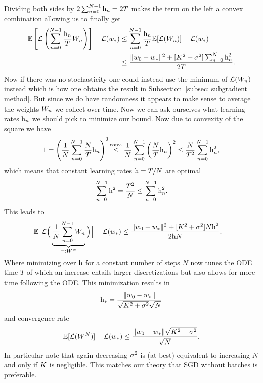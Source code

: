 Dividing both sides by \(2\sum_{n=0}^{N-1}\text{h}_n=2T\) makes the term on the left a
convex combination allowing us to finally get 
\begin{align*}
	\mathbb{E}\left[\mathcal{L}\left(\sum_{n=0}^{N-1} \frac{\text{h}_n}{T}W_n\right)\right]-\mathcal{L}(w_*)
	&\le \sum_{n=0}^{N-1} \frac{\text{h}_n}{T}\mathbb{E}[\mathcal{L}(W_n)]-\mathcal{L}(w_*)\\
	&\le \frac{
		\|w_0 - w_*\|^2 + [K^2+\sigma^2]\sum_{n=0}^N \text{h}_n^2
	}{
		2T
	}.
\end{align*}
Now if there was no stochasticity one could instead use the minimum of
\(\mathcal{L}(W_n)\) instead which is how one obtains the result in
Subsection~\ref{subsec: subgradient method}. But since we do have randomness
it appears to make sense to average the weights \(W_n\) we collect over
time.
Now we can ask ourselves what learning rates \(\text{h}_n\) we should pick to
minimize our bound. Now due to convexity of the square we have
\begin{align*}
	1 = \left(\frac{1}{N}\sum_{n=0}^{N-1}\frac{N}{T}\lr_n\right)^2
	\xle{\text{conv.}} \frac{1}{N}\sum_{n=0}^{N-1}\left(\frac{N}{T}\lr_n\right)^2
	\le \frac{N}{T^2}\sum_{n=0}^{N-1}\lr_n^2,
\end{align*}
which means that constant learning rates \(\text{h}=T/N\) are optimal
\begin{align*}
	\sum_{n=0}^{N-1}\text{h}^2 = \frac{T^2}{N} \le \sum_{n=0}^{N-1}\text{h}_n^2.
\end{align*}
This leads to
\begin{align*}
	\mathbb{E}\Big[
		\mathcal{L}\Big(\underbrace{
			\frac{1}{N}\sum_{n=0}^{N-1}W_n
		}_{=:W^N}\Big)
	\Big]-\mathcal{L}(w_*)
	&\le \frac{
		\|w_0 - w_*\|^2 + [K^2+\sigma^2]N\text{h}^2
	}{2\text{h} N}.
\end{align*}
Where minimizing over \(\text{h}\) for a constant number of steps \(N\) now tunes the
ODE time \(T\) of which an increase entails larger discretizations but also
allows for more time following the ODE.
This minimization results in
\begin{align*}
	\text{h}_* = \frac{\|w_0-w_*\|}{\sqrt{K^2+\sigma^2}\sqrt{N}}
\end{align*}
and convergence rate
\begin{align*}
	\mathbb{E}[\mathcal{L}(W^N)] -\mathcal{L}(w_*)
	\le \frac{\|w_0-w_*\|\sqrt{K^2+\sigma^2}}{\sqrt{N}}.
\end{align*}
In particular note that again decreasing \(\sigma^2\) is (at best) equivalent
to increasing \(N\) and only if \(K\) is negligible. This matches our
theory that SGD without batches is preferable.

